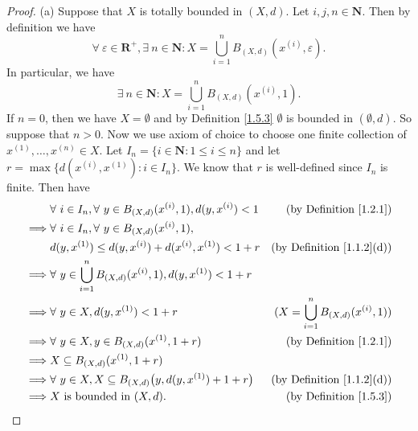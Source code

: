 \begin{proof}{(a)}
    Suppose that \(X\) is totally bounded in \((X, d)\).
    Let \(i, j, n \in \mathbf{N}\).
    Then by definition we have
    \[
        \forall\ \varepsilon \in \mathbf{R}^+, \exists\ n \in \mathbf{N} : X = \bigcup_{i = 1}^n B_{(X, d)}(x^{(i)}, \varepsilon).
    \]
    In particular, we have
    \[
        \exists\ n \in \mathbf{N} : X = \bigcup_{i = 1}^n B_{(X, d)}(x^{(i)}, 1).
    \]
    If \(n = 0\), then we have \(X = \emptyset\) and by Definition \ref{1.5.3} \(\emptyset\) is bounded in \((\emptyset, d)\).
    So suppose that \(n > 0\).
    Now we use axiom of choice to choose one finite collection of \(x^{(1)}, \dots, x^{(n)} \in X\).
    Let \(I_n = \{i \in \mathbf{N} : 1 \leq i \leq n\}\) and let \(r = \max\{d(x^{(i)}, x^{(1)}) : i \in I_n\}\).
    We know that \(r\) is well-defined since \(I_n\) is finite.
    Then have
    \begin{align*}
                 & \forall\ i \in I_n, \forall\ y \in B_{(X, d)}(x^{(i)}, 1), d(y, x^{(i)}) < 1   & \text{(by Definition \ref{1.2.1})}             \\
        \implies & \forall\ i \in I_n, \forall\ y \in B_{(X, d)}(x^{(i)}, 1),                                                                      \\
                 & d(y, x^{(1)}) \leq d(y, x^{(i)}) + d(x^{(i)}, x^{(1)}) < 1 + r                 & \text{(by Definition \ref{1.1.2}(d))}          \\
        \implies & \forall\ y \in \bigcup_{i = 1}^n B_{(X, d)}(x^{(i)}, 1), d(y, x^{(1)}) < 1 + r                                                  \\
        \implies & \forall\ y \in X, d(y, x^{(1)}) < 1 + r                                        & (X = \bigcup_{i = 1}^n B_{(X, d)}(x^{(i)}, 1)) \\
        \implies & \forall\ y \in X, y \in B_{(X, d)}(x^{(1)}, 1 + r)                             & \text{(by Definition \ref{1.2.1})}             \\
        \implies & X \subseteq B_{(X, d)}(x^{(1)}, 1 + r)                                                                                          \\
        \implies & \forall\ y \in X, X \subseteq B_{(X, d)}\big(y, d(y, x^{(1)}) + 1 + r\big)     & \text{(by Definition \ref{1.1.2}(d))}          \\
        \implies & X \text{ is bounded in } (X, d).                                               & \text{(by Definition \ref{1.5.3})}
    \end{align*}
\end{proof}

